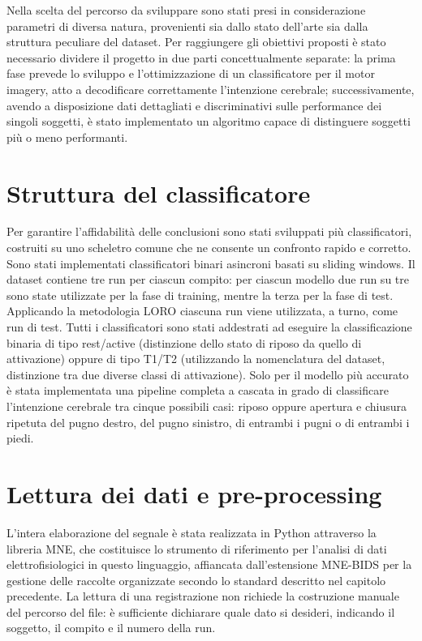 Nella scelta del percorso da sviluppare sono stati presi in considerazione parametri di diversa natura, provenienti sia dallo stato dell’arte sia dalla struttura peculiare del dataset. Per raggiungere gli obiettivi proposti è stato necessario dividere il progetto in due parti concettualmente separate: la prima fase prevede lo sviluppo e l’ottimizzazione di un classificatore per il motor imagery, atto a decodificare correttamente l’intenzione cerebrale; successivamente, avendo a disposizione dati dettagliati e discriminativi sulle performance dei singoli soggetti, è stato implementato un algoritmo capace di distinguere soggetti più o meno performanti.

\section{Struttura del classificatore}
Per garantire l'affidabilità delle conclusioni sono stati sviluppati più classificatori, costruiti su uno scheletro comune che ne consente un confronto rapido e corretto. 
Sono stati implementati classificatori binari asincroni basati su sliding windows. Il dataset contiene tre run per ciascun compito: per ciascun modello due run su tre sono state utilizzate per la fase di training, mentre la terza per la fase di test. Applicando la metodologia LORO ciascuna run viene utilizzata, a turno, come run di test. Tutti i classificatori sono stati addestrati ad eseguire la classificazione binaria di tipo rest/active (distinzione dello stato di riposo da quello di attivazione) oppure di tipo T1/T2 (utilizzando la nomenclatura del dataset, distinzione tra due diverse classi di attivazione). Solo per il modello più accurato è stata implementata una pipeline completa a cascata in grado di classificare l'intenzione cerebrale tra cinque possibili casi: riposo oppure apertura e chiusura ripetuta del pugno destro, del pugno sinistro, di entrambi i pugni o di entrambi i piedi.


\section{Lettura dei dati e pre-processing}
L’intera elaborazione del segnale è stata realizzata in Python attraverso la libreria MNE, che costituisce lo strumento di riferimento per l’analisi di dati elettrofisiologici in questo linguaggio, affiancata dall’estensione MNE-BIDS per la gestione delle raccolte organizzate secondo lo standard descritto nel capitolo precedente.
La lettura di una registrazione non richiede la costruzione manuale del percorso del file: è sufficiente dichiarare quale dato si desideri, indicando il soggetto, il compito e il numero della run.


